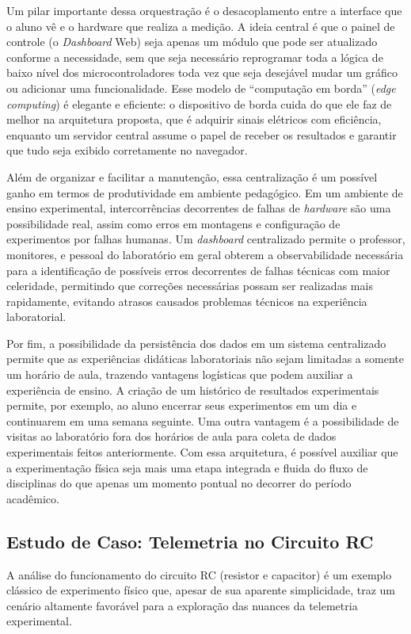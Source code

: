 Um pilar importante dessa orquestração é o desacoplamento entre a interface que o aluno vê e o hardware que realiza a medição. A ideia central é que o painel de controle (o \textit{Dashboard} Web) seja apenas um módulo que pode ser atualizado conforme a necessidade, sem que seja necessário reprogramar toda a lógica de baixo nível dos microcontroladores toda vez que seja desejável mudar um gráfico ou adicionar uma funcionalidade. Esse modelo de ``computação em borda'' (\textit{edge computing}) é elegante e eficiente: o dispositivo de borda cuida do que ele faz de melhor na arquitetura proposta, que é adquirir sinais elétricos com eficiência, enquanto um servidor central assume o papel de receber os resultados e garantir que tudo seja exibido corretamente no navegador.

Além de organizar e facilitar a manutenção, essa centralização é um possível ganho em termos de produtividade em ambiente pedagógico. Em um ambiente de ensino experimental, intercorrências decorrentes de falhas de \textit{hardware} são uma possibilidade real, assim como erros em montagens e configuração de experimentos por falhas humanas. Um \textit{dashboard} centralizado permite o professor, monitores, e pessoal do laboratório em geral obterem a observabilidade necessária para a identificação de possíveis erros decorrentes de falhas técnicas com maior celeridade, permitindo que correções necessárias possam ser realizadas mais rapidamente, evitando atrasos causados problemas técnicos na experiência laboratorial.

Por fim, a possibilidade da persistência dos dados em um sistema centralizado permite que as experiências didáticas laboratoriais não sejam limitadas a somente um horário de aula, trazendo vantagens logísticas que podem auxiliar a experiência de ensino. A criação de um histórico de resultados experimentais permite, por exemplo, ao aluno encerrar seus experimentos em um dia e continuarem em uma semana seguinte. Uma outra vantagem é a possibilidade de visitas ao laboratório fora dos horários de aula para coleta de dados experimentais feitos anteriormente. Com essa arquitetura, é possível auxiliar que a experimentação física seja mais uma etapa integrada e fluida do fluxo de disciplinas do que apenas um momento pontual no decorrer do período acadêmico.

\subsection{Estudo de Caso: Telemetria no Circuito RC}
A análise do funcionamento do circuito RC (resistor e capacitor) é um exemplo clássico de experimento físico que, apesar de sua aparente simplicidade, traz um cenário altamente favorável para a exploração das nuances da telemetria experimental.

